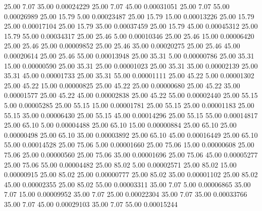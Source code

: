      25.00      7.07     35.00     0.00024229
     25.00      7.07     45.00     0.00031051
     25.00      7.07     55.00     0.00026989
     25.00     15.79      5.00     0.00023487
     25.00     15.79     15.00     0.00013226
     25.00     15.79     25.00     0.00017104
     25.00     15.79     35.00     0.00037459
     25.00     15.79     45.00     0.00045312
     25.00     15.79     55.00     0.00034317
     25.00     25.46      5.00     0.00010346
     25.00     25.46     15.00     0.00006420
     25.00     25.46     25.00     0.00009852
     25.00     25.46     35.00     0.00020275
     25.00     25.46     45.00     0.00020614
     25.00     25.46     55.00     0.00013948
     25.00     35.31      5.00     0.00000786
     25.00     35.31     15.00     0.00000590
     25.00     35.31     25.00     0.00001023
     25.00     35.31     35.00     0.00002139
     25.00     35.31     45.00     0.00001733
     25.00     35.31     55.00     0.00001111
     25.00     45.22      5.00     0.00001302
     25.00     45.22     15.00     0.00000825
     25.00     45.22     25.00     0.00000680
     25.00     45.22     35.00     0.00001577
     25.00     45.22     45.00     0.00002838
     25.00     45.22     55.00     0.00002440
     25.00     55.15      5.00     0.00005285
     25.00     55.15     15.00     0.00001781
     25.00     55.15     25.00     0.00001183
     25.00     55.15     35.00     0.00006430
     25.00     55.15     45.00     0.00014296
     25.00     55.15     55.00     0.00014817
     25.00     65.10      5.00     0.00004488
     25.00     65.10     15.00     0.00000884
     25.00     65.10     25.00     0.00000498
     25.00     65.10     35.00     0.00003892
     25.00     65.10     45.00     0.00016449
     25.00     65.10     55.00     0.00014528
     25.00     75.06      5.00     0.00001660
     25.00     75.06     15.00     0.00000608
     25.00     75.06     25.00     0.00000560
     25.00     75.06     35.00     0.00001696
     25.00     75.06     45.00     0.00005277
     25.00     75.06     55.00     0.00004482
     25.00     85.02      5.00     0.00002571
     25.00     85.02     15.00     0.00000915
     25.00     85.02     25.00     0.00000777
     25.00     85.02     35.00     0.00001102
     25.00     85.02     45.00     0.00002355
     25.00     85.02     55.00     0.00003311
     35.00      7.07      5.00     0.00006865
     35.00      7.07     15.00     0.00009952
     35.00      7.07     25.00     0.00022304
     35.00      7.07     35.00     0.00033766
     35.00      7.07     45.00     0.00029103
     35.00      7.07     55.00     0.00015244
